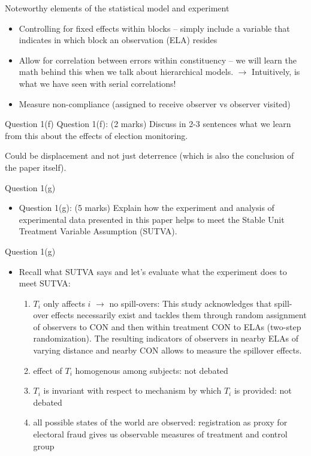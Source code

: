 \documentclass[xcolor=table,dvipsnames]{beamer}
\begin{document}
\begin{frame}{Noteworthy elements of the statistical model and experiment}
\begin{itemize}
\item Controlling for fixed effects within blocks \pause -- simply include a variable that indicates in which block an observation (ELA) resides \pause
\item Allow for correlation between errors within constituency \pause -- we will learn the math behind this when we talk about hierarchical models. \pause $\rightarrow$ Intuitively, is what we have seen with serial correlations! \pause
\item Measure non-compliance (assigned to receive observer vs observer visited)
\end{itemize}

\end{frame}

\begin{frame}{Question 1(f)}
Question 1(f): (2 marks) Discuss in 2-3 sentences what we learn from this about the effects of election monitoring. \pause

Could be displacement and not just deterrence (which is also the conclusion of the paper itself).
\end{frame}


\begin{frame}{Question 1(g)}
\begin{itemize}
\item[] Question 1(g): (5 marks) Explain how the experiment and analysis of experimental data presented in this paper helps to meet the Stable Unit Treatment Variable Assumption (SUTVA).
\end{itemize}
\end{frame}

\begin{frame}{Question 1(g)}
\begin{itemize}
\item Recall what SUTVA says and let's evaluate what the experiment does to meet SUTVA: \pause
\begin{enumerate}
\item $T_i$ only affects $i$  $\rightarrow$ no spill-overs: This study acknowledges that spill-over effects necessarily exist and tackles them through random assignment of observers to CON and then within treatment CON to ELAs (two-step randomization). The resulting indicators of observers in nearby ELAs of varying distance and nearby CON allows to measure the spillover effects. \pause
\item effect of $T_i$ homogenous among subjects: not debated \pause
\item $T_i$ is invariant with respect to mechanism by which $T_i$ is provided: not debated \pause
\item all possible states of the world are observed: registration as proxy for electoral fraud gives us observable measures of treatment and control group
\end{enumerate}
\end{itemize}
\end{frame}
\end{document}
